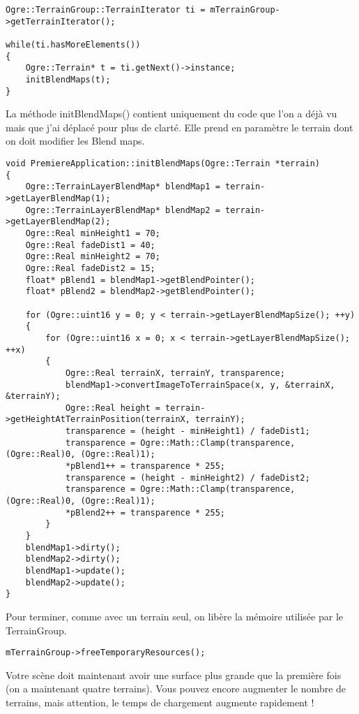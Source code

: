 \begin{lstlisting}[caption={}]
Ogre::TerrainGroup::TerrainIterator ti = mTerrainGroup->getTerrainIterator();

while(ti.hasMoreElements())
{
    Ogre::Terrain* t = ti.getNext()->instance;
    initBlendMaps(t);
}
\end{lstlisting}

La m\'ethode initBlendMaps() contient uniquement du code que l'on a d\'ej\`a vu mais que j'ai d\'eplac\'e pour plus de clart\'e. Elle prend en param\`etre le terrain dont on doit modifier les Blend maps.

\begin{lstlisting}[caption={}]
void PremiereApplication::initBlendMaps(Ogre::Terrain *terrain)
{
    Ogre::TerrainLayerBlendMap* blendMap1 = terrain->getLayerBlendMap(1);
    Ogre::TerrainLayerBlendMap* blendMap2 = terrain->getLayerBlendMap(2);
    Ogre::Real minHeight1 = 70;
    Ogre::Real fadeDist1 = 40;
    Ogre::Real minHeight2 = 70;
    Ogre::Real fadeDist2 = 15;
    float* pBlend1 = blendMap1->getBlendPointer();
    float* pBlend2 = blendMap2->getBlendPointer();

    for (Ogre::uint16 y = 0; y < terrain->getLayerBlendMapSize(); ++y)
    {
        for (Ogre::uint16 x = 0; x < terrain->getLayerBlendMapSize(); ++x)
        {
            Ogre::Real terrainX, terrainY, transparence;
            blendMap1->convertImageToTerrainSpace(x, y, &terrainX, &terrainY);
            Ogre::Real height = terrain->getHeightAtTerrainPosition(terrainX, terrainY);
            transparence = (height - minHeight1) / fadeDist1;
            transparence = Ogre::Math::Clamp(transparence, (Ogre::Real)0, (Ogre::Real)1);
            *pBlend1++ = transparence * 255;
            transparence = (height - minHeight2) / fadeDist2;
            transparence = Ogre::Math::Clamp(transparence, (Ogre::Real)0, (Ogre::Real)1);
            *pBlend2++ = transparence * 255;
        }
    }
    blendMap1->dirty();
    blendMap2->dirty();
    blendMap1->update();
    blendMap2->update();
}
\end{lstlisting}

Pour terminer, comme avec un terrain seul, on lib\`ere la m\'emoire utilis\'ee par le TerrainGroup.

\begin{lstlisting}[caption={}]
mTerrainGroup->freeTemporaryResources();
\end{lstlisting}

Votre sc\`ene doit maintenant avoir une surface plus grande que la première fois (on a maintenant quatre terrains). Vous pouvez encore augmenter le nombre de terrains, mais attention, le temps de chargement augmente rapidement !



